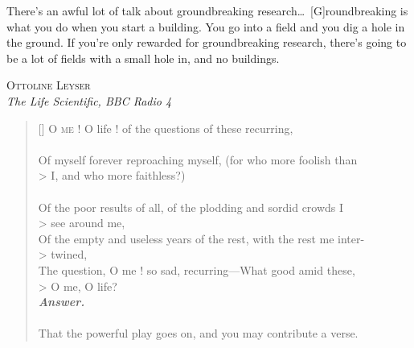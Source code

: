 \clearpage
\begin{vplace} %

\setlength{}
\epigraph{There's an awful lot of talk about groundbreaking research\ldots\ [G]roundbreaking is what you do when you start a building. You go into a field and you dig a hole in the ground. If you're only rewarded for groundbreaking research, there's going to be a lot of fields with a small hole in, and no buildings.}{\textsc{Ottoline Leyser}\\ \textit{The Life Scientific, BBC Radio 4}}

\vspace{2\baselineskip}

\settowidth{\versewidth}{Of myself forever reproaching myself, (for who more foolish than)} %
\begin{verse}[\versewidth]
O \textsc{me} ! O life ! of the questions of these recurring, \\
\dotrule{\versewidth} \\
Of myself forever reproaching myself, (for who more foolish than \\> I, and who more faithless?) \\
\dotrule{\versewidth} \\
Of the poor results of all, of the plodding and sordid crowds I \\> see around me, \\
Of the empty and useless years of the rest, with the rest me inter- \\> twined, \\
The question, O me ! so sad, recurring---What good amid these, \\> O me, O life? \\
 \textbf{\textit{\footnotesize Answer.}} \\
\dotrule{\versewidth} \\
That the powerful play goes on, and you may contribute a verse.\\
\end{verse}

\end{vplace}

\cleardoublepage
\pagestyle{plain}

{
\hypersetup{linkcolor=black} %
\tableofcontents* %
}

\clearpage
\pagestyle{\defstyle}
\mainmatter

